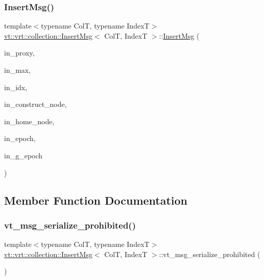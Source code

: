 \subsubsection{\texorpdfstring{Insert\+Msg()}{InsertMsg()}\hspace{0.1cm}{\footnotesize\ttfamily [2/2]}}
{\footnotesize\ttfamily template$<$typename ColT, typename IndexT$>$ \\
\hyperlink{structvt_1_1vrt_1_1collection_1_1_insert_msg}{vt\+::vrt\+::collection\+::\+Insert\+Msg}$<$ ColT, IndexT $>$\+::\hyperlink{structvt_1_1vrt_1_1collection_1_1_insert_msg}{Insert\+Msg} (\begin{DoxyParamCaption}\item[{\hyperlink{structvt_1_1vrt_1_1collection_1_1_collection_proxy}{Collection\+Proxy}$<$ ColT, IndexT $>$}]{in\+\_\+proxy,  }\item[{IndexT}]{in\+\_\+max,  }\item[{IndexT}]{in\+\_\+idx,  }\item[{\hyperlink{namespacevt_a866da9d0efc19c0a1ce79e9e492f47e2}{Node\+Type}}]{in\+\_\+construct\+\_\+node,  }\item[{\hyperlink{namespacevt_a866da9d0efc19c0a1ce79e9e492f47e2}{Node\+Type}}]{in\+\_\+home\+\_\+node,  }\item[{\hyperlink{namespacevt_a985a5adf291c34a3ca263b3378388236}{Epoch\+Type}}]{in\+\_\+epoch,  }\item[{\hyperlink{namespacevt_a985a5adf291c34a3ca263b3378388236}{Epoch\+Type}}]{in\+\_\+g\+\_\+epoch }\end{DoxyParamCaption})\hspace{0.3cm}{\ttfamily [inline]}}



\subsection{Member Function Documentation}
\mbox{\label{structvt_1_1vrt_1_1collection_1_1_insert_msg_af1f1ec228c83e563542f5959f715be71}} 
\subsubsection{\texorpdfstring{vt\+\_\+msg\+\_\+serialize\+\_\+prohibited()}{vt\_msg\_serialize\_prohibited()}}
{\footnotesize\ttfamily template$<$typename ColT, typename IndexT$>$ \\
\hyperlink{structvt_1_1vrt_1_1collection_1_1_insert_msg}{vt\+::vrt\+::collection\+::\+Insert\+Msg}$<$ ColT, IndexT $>$\+::vt\+\_\+msg\+\_\+serialize\+\_\+prohibited (\begin{DoxyParamCaption}{ }\end{DoxyParamCaption})}



